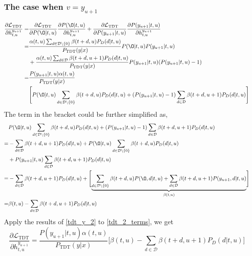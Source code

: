 \documentclass{article}
\begin{document}
\subsubsection{The case when $v=y_{u+1}$}
\begin{equation}
\begin{aligned}
 \frac{\partial{\mathcal{L}_\text{TDT}}}{\partial{h_{t, u}^{y_{u+1}}}} = & \frac{\partial{\mathcal{L}_\text{TDT}}}{\partial{P(\O| t, u)}} \frac{\partial{P(\O| t, u)}}{\partial{h_{t, u}^{y_{u+1}}}} + \frac{\partial{\mathcal{L}_\text{TDT}}}{\partial{P(y_{u+1}| t, u)}} \frac{\partial{P(y_{u+1}| t, u)}}{\partial{h_{t, u}^{y_{u+1}}}}  \\
 = & \frac{\alpha(t, u) \sum_{d \in \mathcal{D} \setminus \{0\}} {\beta(t + d,u) P_D(d|t, u)}} {P_\text{TDT}(y|x)} P(\O| t, u) P(y_{u+1}| t, u) \\
 & + \frac{\alpha(t, u) \sum_{d \in \mathcal{D}}                 {\beta(t + d,u+1)P_D(d|t,u)}} {P_\text{TDT}(y|x)} P(y_{u+1}| t, u) (P(y_{u+1}|t, u) - 1) \\
 = & \frac{P(y_{u+1}|t, u) \alpha(t, u)}{P_\text{TDT}(y|x)}\\
 & \Biggl[ P(\O|t, u)  \sum_{d \in \mathcal{D} \setminus \{0\}} {\beta(t + d,u) P_D(d|t, u)} + (P(y_{u+1}|t, u) - 1) \sum_{d \in \mathcal{D}}                 {\beta(t + d,u+1)P_D(d|t,u)}  \Biggr]
 \end{aligned} 
\end{equation}
The term in the bracket could be further simplified as,
\begin{equation}\label{tdt_y_2}
\begin{aligned}
&  P(\O|t, u) \sum_{d \in \mathcal{D} \setminus \{0\}} {\beta(t + d,u) P_D(d|t, u)} + (P(y_{u+1}|t, u) - 1) \sum_{d \in \mathcal{D}}                 {\beta(t + d,u+1)P_D(d|t,u)}   \\
= & -\sum_{d \in \mathcal{D}} {\beta(t + d,u+1) P_D(d|t, u)} + P(\O|t, u) \sum_{d \in \mathcal{D} \setminus \{0\}} {\beta(t + d,u) P_D(d|t, u)} \\
& + P(y_{u+1}|t, u) \sum_{d \in \mathcal{D}}                 {\beta(t + d,u+1)P_D(d|t,u)}  \\
= & -\sum_{d \in \mathcal{D} } {\beta(t + d,u+1) P_D(d|t, u)} + \Biggl[ \underbrace{\sum_{d \in \mathcal{D} \setminus \{0\}} {\beta(t + d,u) P(\O, d|t, u)} + \sum_{d \in \mathcal{D}}{\beta(t + d,u+1)P(y_{u+1}, d|t,u)}}_{\beta(t, u)} \Biggr] \\
= &\beta(t, u) -\sum_{d \in \mathcal{D} } {\beta(t + d,u+1) P_D(d|t, u)} 
 \end{aligned}
\end{equation}
Apply the results of \ref{tdt_y_2} to \ref{tdt_2_terms}, we get
\begin{equation}\label{tdt_fm_2}
\frac{\partial{\mathcal{L}_\text{TDT}}}{\partial{h_{t, u}^{y_{u+1}}}} =    \frac{P(y_{u+1}|t, u) \alpha(t, u)}{P_\text{TDT}(y|x)} \Biggl[\beta(t, u) -\sum_{d \in \mathcal{D} } {\beta(t + d,u + 1) P_D(d|t, u)}  \Biggr]
\end{equation}
\end{document}
